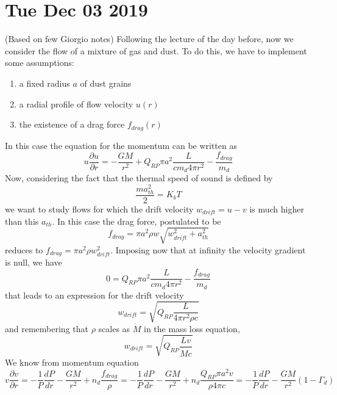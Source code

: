 \documentclass[main.tex]{subfiles}
\begin{document}
\section*{Tue Dec 03 2019}

(Based on few Giorgio notes)
Following the lecture of the day before, now we consider the flow of a mixture of gas and dust. To do this, we have to implement some assumptions:
\begin{enumerate}
    \item a fixed radius $a$ of dust grains
    \item a radial profile of flow velocity $u(r)$
    \item the existence of a drag force $f_{drag}(r)$
\end{enumerate}
In this case the equation for the momentum can be written as
\begin{equation}
    u \frac{\partial u}{\partial r}=-\frac{GM}{r^2}+Q_{RP}\pi a^2 \frac{L}{c m_d 4\pi r^2}-\frac{f_{drag}}{m_d}
\end{equation}
Now, considering the fact that the thermal speed of sound is defined by
\begin{equation}
    \frac{m a_{th}^2}{2}=K_b T
\end{equation}
we want to study flows for which the drift velocity $w_{drift}=u-v$ is much higher than this $a_{th}$. In this case the drag force, postulated to be
\begin{equation}
    f_{drag}=\pi a^2\rho w \sqrt{w_{drift}^2+a_{th}^2}
\end{equation}
reduces to $f_{drag}=\pi a^2\rho w_{drift}^2$.
Imposing now that at infinity the velocity gradient is null, we have
\begin{equation}
    0=Q_{RP}\pi a^2 \frac{L}{c m_d 4\pi r^2}-\frac{f_{drag}}{m_d}
\end{equation}
that leads to an expression for the drift velocity
\begin{equation}
    w_{drift}=\sqrt{Q_{RP}\frac{L}{4\pi r^2\rho c}}
\end{equation}
and remembering that $\rho$ scales as $\dot M$ in the mass loss equation,
\begin{equation}
    w_{drift}=\sqrt{Q_{RP}\frac{L v}{\dot M c}}
\end{equation}
We know from momentum equation
\begin{equation}
    v \frac{\partial v}{\partial r}=-\frac{1}{P}\frac{d P}{d r}-\frac{GM}{r^2}+n_d\frac{f_{drag}}{\rho}= -\frac{1}{P}\frac{d P}{d r}-\frac{GM}{r^2}+n_d\frac{Q_{RP}\pi a^2 v}{\rho 4\pi c}=-\frac{1}{P}\frac{d P}{d r}-\frac{GM}{r^2}(1-\Gamma_d)
\end{equation}
\end{document}
